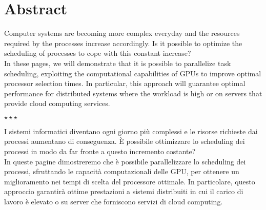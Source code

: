 \chapter*{Abstract}\label{abstract}
Computer systems are becoming more complex everyday and the resources required by the processes increase accordingly. Is it possible to optimize the scheduling of processes to cope with this constant increase? \\
In these pages, we will demonstrate that it is possible to parallelize task scheduling, exploiting the computational capabilities of GPUs to improve optimal processor selection times. In particular, this approach will guarantee optimal performance for distributed systems where the workload is high or on servers that provide cloud computing services.\\
\vspace{50pt}
\begin{center}
\large$\star\star\star$
\end{center}
\vspace{50pt}
I sistemi informatici diventano ogni giorno più complessi e le risorse richieste dai processi aumentano di conseguenza. È possibile ottimizzare lo scheduling dei processi in modo da far fronte a questo incremento costante?\\
In queste pagine dimostreremo che è possibile parallelizzare lo scheduling dei processi, sfruttando le capacità computazionali delle GPU, per ottenere un miglioramento nei tempi di scelta del processore ottimale. In particolare, questo approccio garantirà ottime prestazioni a sistemi distribuiti in cui il carico di lavoro è elevato o su server che forniscono servizi di cloud computing.

